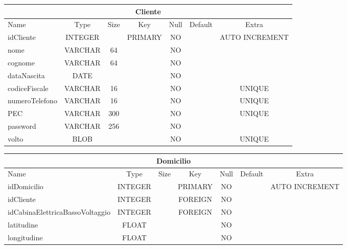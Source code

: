 \begin{center}
    \begin{tabular}{ |l|c|c|c|c|c|c| } 
        \hline
        \multicolumn{7}{|c|}{Cliente} \\
        \hline
            Name             & Type     & Size  & Key       & Null  & Default   & Extra \\
        \hline
            idCliente        & INTEGER  &       & PRIMARY   & NO    &           & AUTO INCREMENT \\
            nome             & VARCHAR  & 64    &           & NO    &           & \\
            cognome          & VARCHAR  & 64    &           & NO    &           & \\
            dataNascita      & DATE     &       &           & NO    &           & \\
            codiceFiscale    & VARCHAR  & 16    &           & NO    &           & UNIQUE \\
            numeroTelefono   & VARCHAR  & 16    &           & NO    &           & UNIQUE \\
            PEC              & VARCHAR  & 300   &           & NO    &           & UNIQUE \\
            password         & VARCHAR  & 256   &           & NO    &           & \\
            volto            & BLOB     &       &           & NO    &           & UNIQUE \\
        \hline
    \end{tabular}
\end{center}
\begin{center}
    \begin{tabular}{ |l|c|c|c|c|c|c| } 
        \hline
        \multicolumn{7}{|c|}{Domicilio} \\
        \hline
            Name             & Type     & Size  & Key       & Null  & Default   & Extra \\
        \hline
            idDomicilio                     & INTEGER  &       & PRIMARY   & NO    &           & AUTO INCREMENT \\
            idCliente                       & INTEGER  &       & FOREIGN   & NO    &           & \\
            idCabinaElettricaBassoVoltaggio & INTEGER  &       & FOREIGN   & NO    &           & \\
            latitudine                      & FLOAT    &       &           & NO    &           & \\
            longitudine                     & FLOAT    &       &           & NO    &           & \\
        \hline
    \end{tabular}
\end{center}

